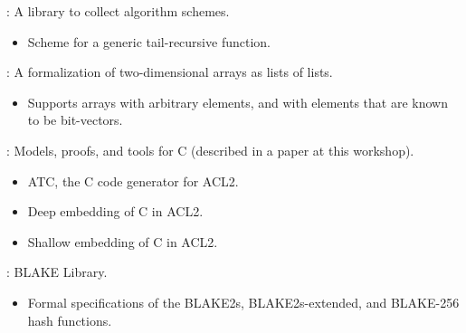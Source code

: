 
\begin{frame}

\newlibtitle

:
A library to collect algorithm schemes.
\begin{itemize}
\item Scheme for a generic tail-recursive function.
\end{itemize}

\end{frame}


\begin{frame}

\newlibtitle

:
A formalization of two-dimensional arrays as lists of lists.
\begin{itemize}
\item Supports arrays with arbitrary elements, and with elements that
  are known to be bit-vectors.
\end{itemize}

\end{frame}


\begin{frame}

\newlibtitle

:
Models, proofs, and tools for C (described in a paper at this workshop).
\begin{itemize}
\item ATC, the C code generator for ACL2.
\item Deep embedding of C in ACL2.
\item Shallow embedding of C in ACL2.
\end{itemize}

\end{frame}


\begin{frame}

\newlibtitle

: BLAKE Library.
\begin{itemize}
\item Formal specifications of the BLAKE2s, BLAKE2s-extended, and
  BLAKE-256 hash functions.
\end{itemize}

\end{frame}

